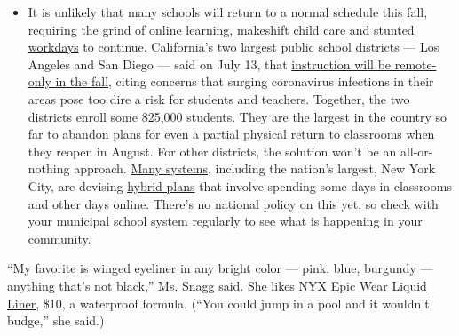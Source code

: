 \begin{itemize}
  \begin{itemize}
  \tightlist
  \item
    It is unlikely that many schools will return to a normal schedule
    this fall, requiring the grind of
    \href{https://www.nytimes.com/2020/06/05/us/coronavirus-education-lost-learning.html?action=click\&pgtype=Article\&state=default\&region=MAIN_CONTENT_3\&context=storylines_faq}{online
    learning},
    \href{https://www.nytimes.com/2020/05/29/us/coronavirus-child-care-centers.html?action=click\&pgtype=Article\&state=default\&region=MAIN_CONTENT_3\&context=storylines_faq}{makeshift
    child care} and
    \href{https://www.nytimes.com/2020/06/03/business/economy/coronavirus-working-women.html?action=click\&pgtype=Article\&state=default\&region=MAIN_CONTENT_3\&context=storylines_faq}{stunted
    workdays} to continue. California's two largest public school
    districts --- Los Angeles and San Diego --- said on July 13, that
    \href{https://www.nytimes.com/2020/07/13/us/lausd-san-diego-school-reopening.html?action=click\&pgtype=Article\&state=default\&region=MAIN_CONTENT_3\&context=storylines_faq}{instruction
    will be remote-only in the fall}, citing concerns that surging
    coronavirus infections in their areas pose too dire a risk for
    students and teachers. Together, the two districts enroll some
    825,000 students. They are the largest in the country so far to
    abandon plans for even a partial physical return to classrooms when
    they reopen in August. For other districts, the solution won't be an
    all-or-nothing approach.
    \href{https://bioethics.jhu.edu/research-and-outreach/projects/eschool-initiative/school-policy-tracker/}{Many
    systems}, including the nation's largest, New York City, are
    devising
    \href{https://www.nytimes.com/2020/06/26/us/coronavirus-schools-reopen-fall.html?action=click\&pgtype=Article\&state=default\&region=MAIN_CONTENT_3\&context=storylines_faq}{hybrid
    plans} that involve spending some days in classrooms and other days
    online. There's no national policy on this yet, so check with your
    municipal school system regularly to see what is happening in your
    community.
  \end{itemize}
\end{itemize}

``My favorite is winged eyeliner in any bright color --- pink, blue,
burgundy --- anything that's not black,'' Ms. Snagg said. She likes
\href{https://www.nyxcosmetics.com/eyes/eyeliner/epic-wear-liquid-liner/NYX_806.html}{NYX
Epic Wear Liquid Liner}, \$10, a waterproof formula. (``You could jump
in a pool and it wouldn't budge,'' she said.)

